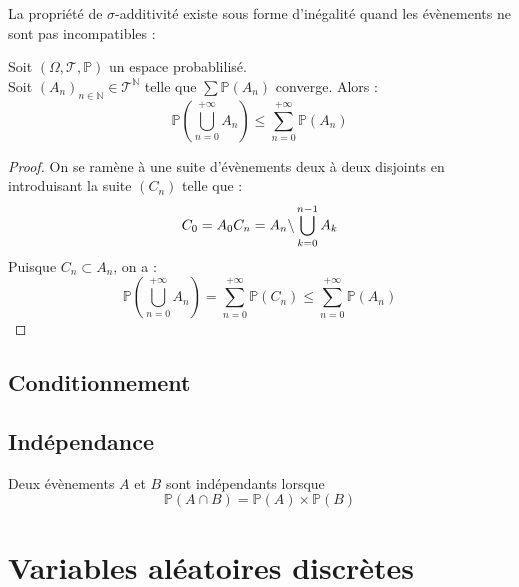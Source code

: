 \documentclass[11pt,a4paper,fleqn,pdftex]{report}
\begin{document}
La propriété de $\sigma$-additivité existe sous forme d'inégalité quand les évènements ne sont pas incompatibles :
\begin{itheorem}
Soit $(\Omega, \mathscr{T},\mathbb{P})$ un espace probablilisé. \\
Soit $(A_n)_{n\in\mathbb{N}} \in \mathscr{T}^\mathbb{N}$ telle que $\sum \mathbb{P}(A_n)$ converge. Alors :
     \begin{equation}
     \mathbb{P}\left( \bigcup_{n=0}^{+\infty} A_n \right) \le \sum_{n=0}^{+\infty} \mathbb{P}(A_n)
     \end{equation}
\end{itheorem}
\begin{proof}
     On se ramène à une suite d'évènements deux à deux disjoints en introduisant la suite $(C_n)$ telle que :
     \begin{equation*}
          C_0 = A_0 \\ C_n = A_n \backslash \bigcup_{k=0}^{n-1}A_k
     \end{equation*}
     Puisque $C_n \subset A_n$, on a : 
     \begin{equation*}
          \mathbb{P} \left( \bigcup_{n=0}^{+\infty} A_n \right) = \sum_{n=0}^{+\infty} \mathbb{P}(C_n) \le \sum_{n=0}^{+\infty} \mathbb{P}(A_n)
     \end{equation*}
\end{proof}
\section{Conditionnement} %
\label{sec:conditionnement}

\section{Indépendance} %
\label{sec:independance}
\begin{dfn}
     Deux évènements $A$ et $B$ sont indépendants lorsque 
     \begin{equation}
     \mathbb{P}(A\cap B) = \mathbb{P}(A)\times \mathbb{P}(B)
     \end{equation}
\end{dfn}
\chapter{Variables aléatoires discrètes} %
\label{cha:variables_aleatoires_discretes}
\end{document}
